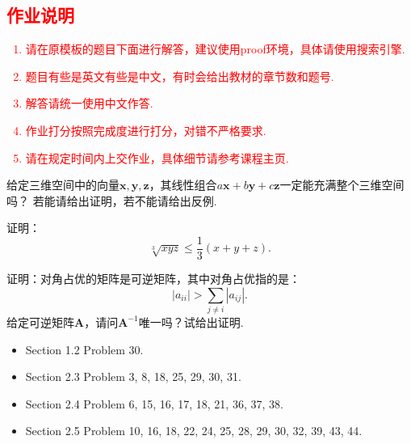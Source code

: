 \documentclass{oxmathproblems}
\begin{document}
\textcolor{red}{
\section*{作业说明}
\begin{enumerate}
  \item 请在原模板的题目下面进行解答，建议使用proof环境，具体请使用搜索引擎.
  \item 题目有些是英文有些是中文，有时会给出教材的章节数和题号.
  \item 解答请统一使用中文作答.
  \item 作业打分按照完成度进行打分，对错不严格要求.
  \item 请在规定时间内上交作业，具体细节请参考课程主页.
\end{enumerate}
}
\newpage



\begin{questions}

\miquestion 
给定三维空间中的向量$\bm{x}, \bm{y}, \bm{z}$，其线性组合$a\bm{x} + b\bm{y} + c \bm{z}$一定能充满整个三维空间吗？
若能请给出证明，若不能请给出反例.

\miquestion
证明：
$$
\sqrt[3]{xyz} \leq \frac{1}{3} (x + y + z).
$$

\miquestion
证明：对角占优的矩阵是可逆矩阵，其中对角占优指的是：
$$
|a_{ii}| > \sum_{j \neq i } |a_{ij}|.
$$
\miquestion
给定可逆矩阵$\bm{A}$，请问$\bm{A}^{-1}$唯一吗？试给出证明.
\miquestion
\begin{itemize}
  \item Section 1.2 Problem 30.
  \item Section 2.3 Problem 3, 8, 18, 25, 29, 30, 31.
  \item Section 2.4 Problem 6, 15, 16, 17, 18, 21, 36, 37, 38.
  \item Section 2.5 Problem 10, 16, 18, 22, 24, 25, 28, 29, 30, 32, 39, 43, 44.
\end{itemize}



\end{questions}
\end{document}
